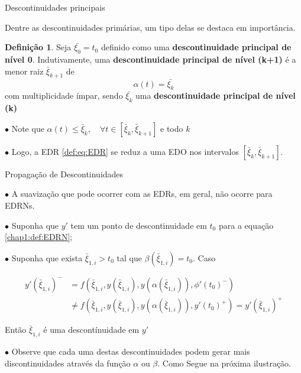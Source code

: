 \documentclass{beamer}
\theoremstyle{plain}
\theoremstyle{definition}
\newtheorem{defi}{Definição}
\begin{document}


\begin{frame}{Descontinuidades principais}

    \small

    Dentre as descontinuidades primárias, um tipo delas se destaca em importância.

    \begin{defi}
        \label{chap2:def:principal_descontinuity}
    Seja $\bar{\xi_0} = t_0$ definido como uma \textbf{descontinuidade principal de nível 0}. Indutivamente, uma \textbf{descontinuidade principal de nível (k+1)} é a menor raiz $\bar{\xi}_{k+1}$ de 
        \[
            \alpha(t) = \bar{\xi_k}
        \]
        com multiplicidade ímpar, sendo $\bar{\xi_k}$ uma \textbf{descontinuidade principal de nível (k)}
    \end{defi}


    $\bullet$ Note que $ \alpha(t) \leq \bar{\xi}_{k}, \quad \forall t \in\left[\bar{\xi}_{k}, \bar{\xi}_{k+1}\right] $ e todo $k$

    $\bullet$ Logo, a EDR \eqref{def:eq:EDR} se reduz a uma EDO nos intervalos $\left[\bar{\xi}_{k}, \bar{\xi}_{k+1}\right]$. 

\end{frame}



\begin{frame}{Propagação de Descontinuidades}
     
    $\bullet$ A suavização que pode ocorrer com as EDRs, em geral, não ocorre para EDRNs. 

    $\bullet$ Suponha que $y'$ tem um ponto de descontinuidade em $t_0$ para a equação \ref{chap1:def:EDRN};

    $\bullet$ Suponha que exista $\bar{\xi}_{1, i} > t_0$ tal que $\beta(\bar{\xi}_{1, i}) = t_0$. Caso

    \footnotesize
    \begin{equation}
        \begin{split}
            y'(\bar{\xi}_{1, i})^- &= f(\bar{\xi}_{1, i}, y(\bar{\xi}_{1, i}), y(\alpha(\bar{\xi}_{1, i})), \phi'(t_0)^-)  \\
                                   &\neq f(\bar{\xi}_{1, i}, y(\bar{\xi}_{1, i}), y(\alpha(\bar{\xi}_{1, i})), y'(t_0)^+) 
                                   = y'(\bar{\xi}_{1, i})^+
        \end{split}
        \label{chap2:eq:disco:edrn}
    \end{equation}

    \normalsize
    Então $\bar{\xi}_{1, i}$ é uma descontínuidade em $y'$

    $\bullet$ Observe que cada uma destas descontinuidades podem gerar mais discontinuidades através da função $\alpha$ ou $\beta$. Como Segue na próxima ilustração.

\end{frame}
\end{document}
